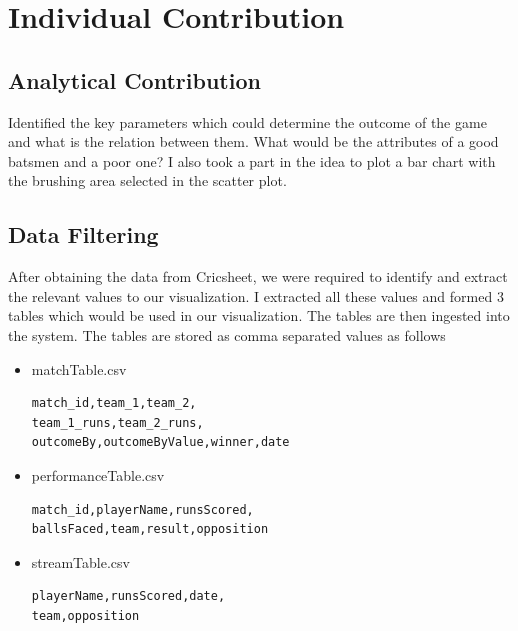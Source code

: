 \documentclass[letterpaper, 10 pt, conference]{ieeeconf}  %
\begin{document}
\section{Individual Contribution}
\subsection{Analytical Contribution} Identified the key parameters which could determine the outcome of the game and what is the relation between them. What would be the attributes of a good batsmen and a poor one? I also took a part in the idea to plot a bar chart with the brushing area selected in the scatter plot.

\subsection{Data Filtering}
After obtaining the data from Cricsheet\cite{cricsheet}, we were required to identify and extract the relevant values to our visualization. I extracted all these values and formed 3 tables which would be used in our visualization. The tables are then ingested into the system. The tables are stored as comma separated values as follows
\begin{itemize}
\item matchTable.csv
\begin{verbatim}
match_id,team_1,team_2,
team_1_runs,team_2_runs,
outcomeBy,outcomeByValue,winner,date
\end{verbatim}
\item performanceTable.csv
\begin{verbatim}
match_id,playerName,runsScored,
ballsFaced,team,result,opposition
\end{verbatim}
\item streamTable.csv
\begin{verbatim}
playerName,runsScored,date,
team,opposition
\end{verbatim}
\end{itemize}
\end{document}
